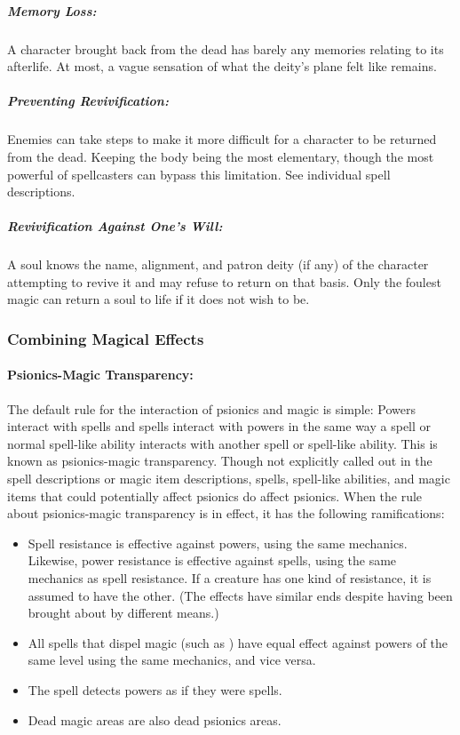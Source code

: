 \subparagraph{Memory Loss:} A character brought back from the dead has barely any memories relating to its afterlife. At most, a vague sensation of what the deity's plane felt like remains.

\subparagraph{Preventing Revivification:} 
Enemies can take steps to make it more difficult for a character to be returned from the dead. 
Keeping the body being the most elementary, though the most powerful of spellcasters can bypass this limitation. 
See individual spell descriptions.

\subparagraph{Revivification Against One's Will:} 
A soul knows the name, alignment, and patron deity (if any) of the character attempting to revive it and may refuse to return on that basis.
Only the foulest magic can return a soul to life if it does not wish to be.
\subsubsection{Combining Magical Effects}
\label{sec:CombiningMagicalEffects}
\paragraph{Psionics-Magic Transparency:} The default rule for the interaction of psionics and magic is simple: 
Powers interact with spells and spells interact with powers in the same way a spell or normal spell-like ability interacts with another spell or spell-like ability. 
This is known as psionics-magic transparency.
Though not explicitly called out in the spell descriptions or magic item descriptions, spells, spell-like abilities, and magic items that could potentially affect psionics do affect psionics. 
When the rule about psionics-magic transparency is in effect, it has the following ramifications:
\begin{itemize}
\item Spell resistance is effective against powers, using the same mechanics. 
Likewise, power resistance is effective against spells, using the same mechanics as spell resistance. 
If a creature has one kind of resistance, it is assumed to have the other. (The effects have similar ends despite having been brought about by different means.)
\item All spells that dispel magic (such as ) have equal effect against powers of the same level using the same mechanics, and vice versa.
\item The spell  detects powers as if they were spells.
\item Dead magic areas are also dead psionics areas.
\end{itemize}
